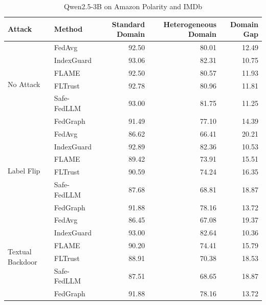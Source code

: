 \documentclass[10pt]{article}
\begin{document}
\begin{table}[htbp]
\centering
\caption{Qwen2.5-3B on Amazon Polarity and IMDb}
\label{tab:qwen3_amazon_imdb}
\small
\begin{tabular}{llrrr}
\toprule
Attack & Method & Standard Domain & Heterogeneous Domain & Domain Gap \\
\midrule
\multirow{6}{*}{No Attack} & FedAvg & 92.50 & 80.01 & 12.49 \\
 & IndexGuard & 93.06 & 82.31 & 10.75 \\
 & FLAME & 92.50 & 80.57 & 11.93 \\
 & FLTrust & 92.78 & 80.96 & 11.81 \\
 & Safe-FedLLM & 93.00 & 81.75 & 11.25 \\
 & FedGraph & 91.49 & 77.10 & 14.39 \\
\midrule
\multirow{6}{*}{Label Flip} & FedAvg & 86.62 & 66.41 & 20.21 \\
 & IndexGuard & 92.89 & 82.36 & 10.53 \\
 & FLAME & 89.42 & 73.91 & 15.51 \\
 & FLTrust & 90.59 & 74.24 & 16.35 \\
 & Safe-FedLLM & 87.68 & 68.81 & 18.87 \\
 & FedGraph & 91.88 & 78.16 & 13.72 \\
\midrule
\multirow{6}{*}{Textual Backdoor} & FedAvg & 86.45 & 67.08 & 19.37 \\
 & IndexGuard & 93.00 & 82.64 & 10.36 \\
 & FLAME & 90.20 & 74.41 & 15.79 \\
 & FLTrust & 88.91 & 70.38 & 18.53 \\
 & Safe-FedLLM & 87.51 & 68.65 & 18.87 \\
 & FedGraph & 91.88 & 78.16 & 13.72 \\
\bottomrule
\end{tabular}
\end{table}
\clearpage
\end{document}
